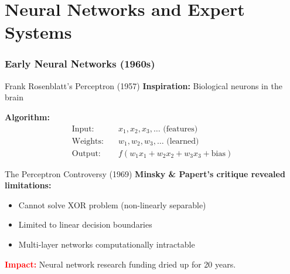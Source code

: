 \documentclass{beamer}
\begin{document}
\section{Neural Networks and Expert Systems}

\begin{frame}
    \frametitle{Early Neural Networks (1960s)}
    \begin{block}{Frank Rosenblatt's Perceptron (1957)}
        \textbf{Inspiration:} Biological neurons in the brain
        
        \textbf{Algorithm:}
        \begin{align}
            \text{Input:} \quad &x_1, x_2, x_3, \ldots \text{ (features)} \\
            \text{Weights:} \quad &w_1, w_2, w_3, \ldots \text{ (learned)} \\
            \text{Output:} \quad &f(w_1x_1 + w_2x_2 + w_3x_3 + \text{bias})
        \end{align}
    \end{block}
    
    \begin{alertblock}{The Perceptron Controversy (1969)}
        \textbf{Minsky \& Papert's critique revealed limitations:}
        \begin{itemize}
            \item Cannot solve XOR problem (non-linearly separable)
            \item Limited to linear decision boundaries
            \item Multi-layer networks computationally intractable
        \end{itemize}
        
        \textcolor{red}{\textbf{Impact:}} Neural network research funding dried up for 20 years.
    \end{alertblock}
\end{frame}
\end{document}
